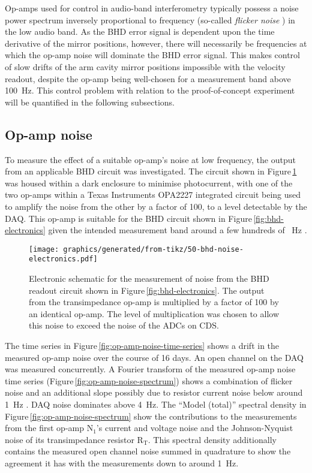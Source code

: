 Op-amps used for control in audio-band interferometry typically possess a noise power spectrum inversely proportional to frequency (so-called \emph{flicker noise} \cite[Section\,11.2.3]{Gray2009}) in the low audio band. As the \gls{BHD} error signal is dependent upon the time derivative of the mirror positions, however, there will necessarily be frequencies at which the op-amp noise will dominate the \gls{BHD} error signal. This makes control of slow drifts of the arm cavity mirror positions impossible with the velocity readout, despite the op-amp being well-chosen for a measurement band above \SI{100}{\hertz}. This control problem with relation to the proof-of-concept experiment will be quantified in the following subsections.

\subsection{\label{sec:op-amp-noise}Op-amp noise}
To measure the effect of a suitable op-amp's noise at low frequency, the output from an applicable BHD circuit was investigated. The circuit shown in Figure\,\ref{fig:bhd-noise-electronics} was housed within a dark enclosure to minimise photocurrent, with one of the two op-amps within a Texas Instruments\textsuperscript{\textregistered} OPA2227 integrated circuit being used to amplify the noise from the other by a factor of \SI{100}{}, to a level detectable by the DAQ. This op-amp is suitable for the BHD circuit shown in Figure\,\ref{fig:bhd-electronics} given the intended measurement band around a few hundreds of \SI{}{\hertz} \cite{Graef2014}.

\begin{figure}
  \centering
  \texttt{[image: graphics/generated/from-tikz/50-bhd-noise-electronics.pdf]}
  \caption[Electronic schematic for the measurement of noise from the balanced homodyne readout]{\label{fig:bhd-noise-electronics}Electronic schematic for the measurement of noise from the BHD readout circuit shown in Figure\,\ref{fig:bhd-electronics}. The output from the transimpedance op-amp is multiplied by a factor of \num{100} by an identical op-amp. The level of multiplication was chosen to allow this noise to exceed the noise of the ADCs on CDS.}
\end{figure}

The time series in Figure\,\ref{fig:op-amp-noise-time-series} shows a drift in the measured op-amp noise over the course of \SI{16}{} days. An open channel on the DAQ was measured concurrently. A Fourier transform of the measured op-amp noise time series (Figure\,\ref{fig:op-amp-noise-spectrum}) shows a combination of flicker noise and an additional slope possibly due to resistor current noise below around \SI{1}{\hertz} \cite{Seifert2009}. DAQ noise dominates above \SI{4}{\hertz}. The ``Model (total)'' spectral density in Figure\,\ref{fig:op-amp-noise-spectrum} show the contributions to the measurements from the first op-amp $\textrm{N}_{1}$'s current and voltage noise and the Johnson-Nyquist noise of its transimpedance resistor $\textrm{R}_{\textrm{T}}$. This spectral density additionally contains the measured open channel noise summed in quadrature to show the agreement it has with the measurements down to around \SI{1}{\hertz}.


